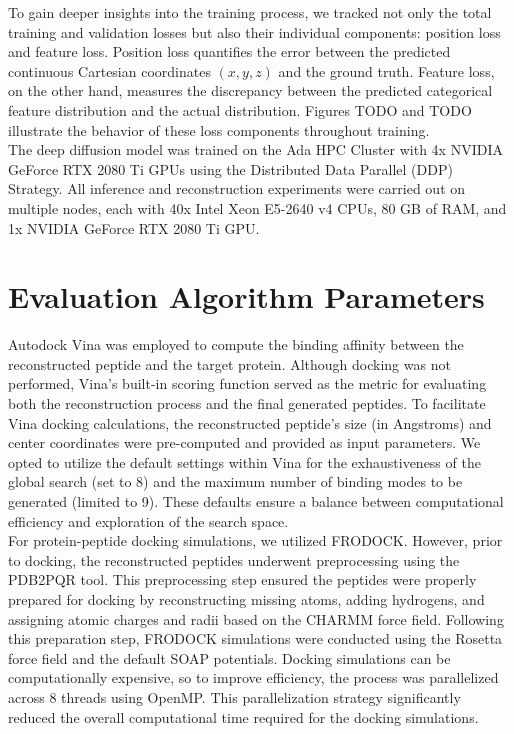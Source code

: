 To gain deeper insights into the training process, we tracked not only the total training and validation losses but also their individual components: position loss and feature loss. Position loss quantifies the error between the predicted continuous Cartesian coordinates $(x, y, z)$ and the ground truth. Feature loss, on the other hand, measures the discrepancy between the predicted categorical feature distribution and the actual distribution. Figures TODO and TODO illustrate the behavior of these loss components throughout training. \\

The deep diffusion model was trained on the Ada HPC Cluster with 4x NVIDIA GeForce RTX 2080 Ti GPUs using the Distributed Data Parallel (DDP) Strategy. All inference and reconstruction experiments were carried out on multiple nodes, each with 40x Intel Xeon E5-2640 v4 CPUs, 80 GB of RAM, and 1x NVIDIA GeForce RTX 2080 Ti GPU.

\section{Evaluation Algorithm Parameters}
Autodock Vina was employed to compute the binding affinity between the reconstructed peptide and the target protein. Although docking was not performed, Vina's built-in scoring function served as the metric for evaluating both the reconstruction process and the final generated peptides. To facilitate Vina docking calculations, the reconstructed peptide's size (in Angstroms) and center coordinates were pre-computed and provided as input parameters. We opted to utilize the default settings within Vina for the exhaustiveness of the global search (set to 8) and the maximum number of binding modes to be generated (limited to 9). These defaults ensure a balance between computational efficiency and exploration of the search space. \\

For protein-peptide docking simulations, we utilized FRODOCK. However, prior to docking, the reconstructed peptides underwent preprocessing using the PDB2PQR tool. This preprocessing step ensured the peptides were properly prepared for docking by reconstructing missing atoms, adding hydrogens, and assigning atomic charges and radii based on the CHARMM force field. Following this preparation step, FRODOCK simulations were conducted using the Rosetta force field and the default SOAP potentials. Docking simulations can be computationally expensive, so to improve efficiency, the process was parallelized across 8 threads using OpenMP. This parallelization strategy significantly reduced the overall computational time required for the docking simulations.

